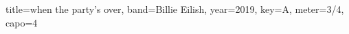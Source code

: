 \documentclass{../../tex/bekki-leadsheet}
\begin{document}
\begin{song}[transpose-capo=true]{title={when the party's over}, band={Billie Eilish}, year={2019}, key={A}, meter={3/4}, capo={4}}

  

\end{song}
\end{document}
